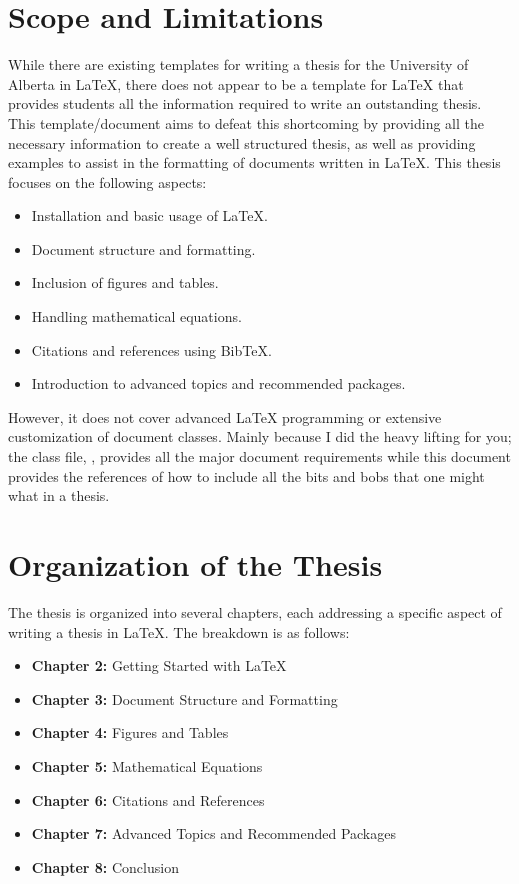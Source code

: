 	\section{Scope and Limitations}
		While there are existing templates for writing a thesis for the University of Alberta in \LaTeX{}, there does not appear to be a template for \LaTeX{} that provides students all the information required to write an outstanding thesis.
		This template/document aims to defeat this shortcoming by providing all the necessary information to create a well structured thesis, as well as providing examples to assist in the formatting of documents written in \LaTeX{}.
		This thesis focuses on the following aspects:
		\begin{itemize}
			\item Installation and basic usage of \LaTeX{}.
			\item Document structure and formatting.
			\item Inclusion of figures and tables.
			\item Handling mathematical equations.
			\item Citations and references using BibTeX.
			\item Introduction to advanced topics and recommended packages.
		\end{itemize}

		However, it does not cover advanced \LaTeX{} programming or extensive customization of document classes.
		Mainly because I did the heavy lifting for you; the class file, , provides all the major document requirements while this document provides the references of how to include all the bits and bobs that one might what in a thesis.

	\section{Organization of the Thesis}
		The thesis is organized into several chapters, each addressing a specific aspect of writing a thesis in \LaTeX{}. 
		The breakdown is as follows:
		\begin{itemize}
			\item \textbf{Chapter 2:} Getting Started with \LaTeX{}
			\item \textbf{Chapter 3:} Document Structure and Formatting
			\item \textbf{Chapter 4:} Figures and Tables
			\item \textbf{Chapter 5:} Mathematical Equations
			\item \textbf{Chapter 6:} Citations and References
			\item \textbf{Chapter 7:} Advanced Topics and Recommended Packages
			\item \textbf{Chapter 8:} Conclusion
		\end{itemize}

